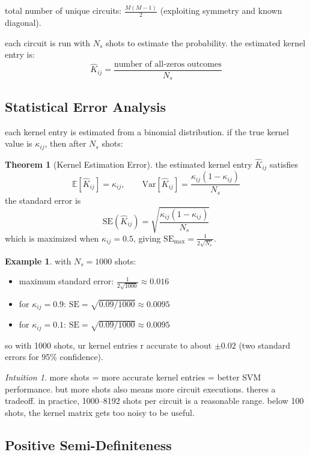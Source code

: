 \documentclass[11pt,a4paper]{article}
\theoremstyle{definition}
\newtheorem{example}{Example}[section]
\newtheorem{theorem}{Theorem}[section]
\theoremstyle{remark}
\newtheorem*{intuition}{Intuition}
\begin{document}
total number of unique circuits: $\frac{M(M-1)}{2}$ (exploiting symmetry and known diagonal).

each circuit is run with $N_s$ shots to estimate the probability. the estimated kernel entry is:
\[
\hat{K}_{ij} = \frac{\text{number of all-zeros outcomes}}{N_s}
\]

\subsection{Statistical Error Analysis}

each kernel entry is estimated from a binomial distribution. if the true kernel value is $\kappa_{ij}$, then after $N_s$ shots:

\begin{theorem}[Kernel Estimation Error]
the estimated kernel entry $\hat{K}_{ij}$ satisfies
\[
\mathbb{E}[\hat{K}_{ij}] = \kappa_{ij}, \qquad \text{Var}[\hat{K}_{ij}] = \frac{\kappa_{ij}(1 - \kappa_{ij})}{N_s}
\]
the standard error is
\[
\text{SE}(\hat{K}_{ij}) = \sqrt{\frac{\kappa_{ij}(1 - \kappa_{ij})}{N_s}}
\]
which is maximized when $\kappa_{ij} = 0.5$, giving $\text{SE}_{\max} = \frac{1}{2\sqrt{N_s}}$.
\end{theorem}

\begin{example}
with $N_s = 1000$ shots:
\begin{itemize}[leftmargin=*]
    \item maximum standard error: $\frac{1}{2\sqrt{1000}} \approx 0.016$
    \item for $\kappa_{ij} = 0.9$: $\text{SE} = \sqrt{0.09/1000} \approx 0.0095$
    \item for $\kappa_{ij} = 0.1$: $\text{SE} = \sqrt{0.09/1000} \approx 0.0095$
\end{itemize}
so with 1000 shots, ur kernel entries r accurate to about $\pm 0.02$ (two standard errors for 95\% confidence).
\end{example}

\begin{intuition}
more shots = more accurate kernel entries = better SVM performance. but more shots also means more circuit executions. theres a tradeoff. in practice, 1000--8192 shots per circuit is a reasonable range. below 100 shots, the kernel matrix gets too noisy to be useful.
\end{intuition}

\subsection{Positive Semi-Definiteness}
\end{document}
